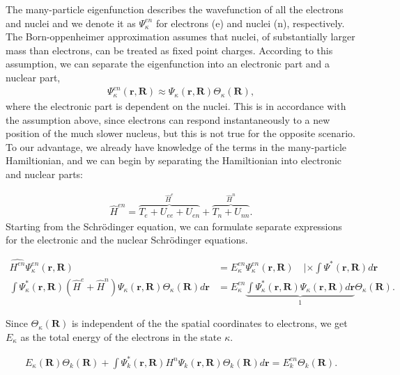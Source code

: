 The many-particle eigenfunction describes the wavefunction of all the electrons and nuclei and we denote it as $\Psi_{\kappa}^{en}$ for electrons (e) and nuclei (n), respectively. The Born-oppenheimer approximation assumes that nuclei, of substantially larger mass than electrons, can be treated as fixed point charges. According to this assumption, we can separate the eigenfunction into an electronic part and a nuclear part,
\begin{align}
  \Psi_\kappa^{en}(\textbf{r}, \textbf{R}) \approx \Psi_{\kappa}(\textbf{r}, \textbf{R})\Theta_{\kappa}(\textbf{R}),
\end{align}
where the electronic part is dependent on the nuclei. This is in accordance with the assumption above, since electrons can respond instantaneously to a new position of the much slower nucleus, but this is not true for the opposite scenario. To our advantage, we already have knowledge of the terms in the many-particle Hamiltionian, and we can begin by separating the Hamiltionian into electronic and nuclear parts:


\begin{align}
  \hat{H}^{en} = \overbrace{T_e + U_{ee} + U_{en}}^{\hat{H}^{e}} + \overbrace{T_n + U_{nn}}^{\hat{H}^{n}}.
\end{align}
Starting from the Schrödinger equation, we can formulate separate expressions for the electronic and the nuclear Schrödinger equations.

\begin{align}
  \hat{H^{en}} \Psi_\kappa^{en}(\textbf{r},\textbf{R}) &= E_\kappa^{en}\Psi_\kappa^{en}(\textbf{r},\textbf{R}) \quad \lvert \times \int \Psi^*(\textbf{r},\textbf{R}) d\textbf{r} \\
  \int \Psi_\kappa^*(\textbf{r},\textbf{R}) (\hat{H}^e + \hat{H}^n)\Psi_\kappa(\textbf{r},\textbf{R})\Theta_\kappa(\textbf{R})d\textbf{r} &= E_\kappa^{en} \underbrace{\int \Psi_\kappa ^* (\textbf{r},\textbf{R}) \Psi_\kappa (\textbf{r},\textbf{R}) d\textbf{r}}_{1} \Theta_\kappa(\textbf{R}).
\end{align}

Since $\Theta_\kappa(\textbf{R})$ is independent of the the spatial coordinates to electrons, we get $E_{\kappa}$ as the total energy of the electrons in the state $\kappa$.

\begin{align}
     E_\kappa(\textbf{R}) \Theta_k(\textbf{R}) + \int \Psi_k^*(\textbf{r},\textbf{R})H^n\Psi_k(\textbf{r},\textbf{R})\Theta_k(\textbf{R})d\textbf{r} = E_k^{en} \Theta_k(\textbf{R}).
\end{align}

